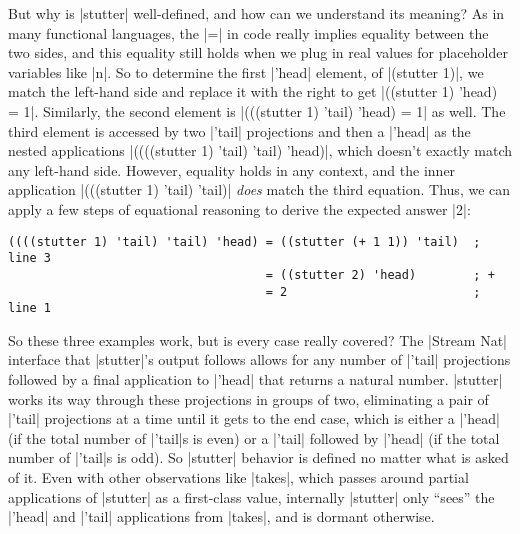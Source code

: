 But why is \scm|stutter| well-defined, and how can we understand its meaning?
As in many functional languages, the \scm|=| in code really implies equality between the two sides, and this equality still holds when we plug in real values for placeholder variables like \scm|n|.
So to determine the first \scm|'head| element, of \scm|(stutter 1)|, we match the left-hand side and replace it with the right to get \scm|((stutter 1) 'head) = 1|.
Similarly, the second element is \scm|(((stutter 1) 'tail) 'head) = 1| as well.
The third element is accessed by two \scm|'tail| projections and then a \scm|'head| as the nested applications \scm|((((stutter 1) 'tail) 'tail) 'head)|, which doesn't exactly match any left-hand side.
However, equality holds in any context, and the inner application \scm|(((stutter 1) 'tail) 'tail)| \emph{does} match the third equation.
Thus, we can apply a few steps of equational reasoning to derive the expected answer \scm|2|:
\begin{verbatim}
((((stutter 1) 'tail) 'tail) 'head) = ((stutter (+ 1 1)) 'tail)  ; line 3
                                    = ((stutter 2) 'head)        ; +
                                    = 2                          ; line 1
\end{verbatim}
So these three examples work, but is every case really covered?
The \scm|Stream Nat| interface that \scm|stutter|'s output follows allows for any number of \scm|'tail| projections followed by a final application to \scm|'head| that returns a natural number.
\scm|stutter| works its way through these projections in groups of two, eliminating a pair of \scm|'tail| projections at a time until it gets to the end case, which is either a \scm|'head| (if the total number of \scm|'tail|s is even) or a \scm|'tail| followed by \scm|'head| (if the total number of \scm|'tail|s is odd).
So \scm|stutter| behavior is defined no matter what is asked of it.
Even with other observations like \scm|takes|, which passes around partial applications of \scm|stutter| as a first-class value, internally \scm|stutter| only ``sees'' the \scm|'head| and \scm|'tail| applications from \scm|takes|, and is dormant otherwise.


